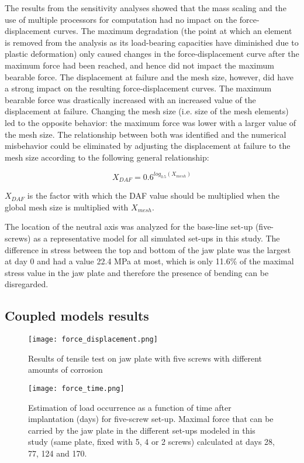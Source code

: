The results from the sensitivity analyses showed that the mass scaling and the use of multiple processors for computation had no impact on the force-displacement curves. The maximum degradation (the point at which an element is removed from the analysis as its load-bearing capacities have diminished due to plastic deformation) only caused changes in the force-displacement curve after the maximum force had been reached, and hence did not impact the maximum bearable force. The displacement at failure and the mesh size, however, did have a strong impact on the resulting force-displacement curves. The maximum bearable force was drastically increased with an increased value of the displacement at failure. Changing the mesh size (i.e. size of the mesh elements) led to the opposite behavior: the maximum force was lower with a larger value of the mesh size. The relationship between both was identified and the numerical misbehavior could be eliminated by adjusting the displacement at failure to the mesh size according to the following general relationship:

\begin{equation}
X_{DAF}=0.6^{log_{0.5}(X_{mesh})} 
\end{equation}

\noindent $X_{DAF}$ is the factor with which the \gls{DAF} value should be multiplied when the global mesh size is multiplied with $X_{mesh}$.

The location of the neutral axis was analyzed for the base-line set-up (five-screws) as a representative model for all simulated set-ups in this study. The difference in stress between the top and bottom of the jaw plate was the largest at day 0 and had a value 22.4 MPa at most, which is only 11.6\% of the maximal stress value in the jaw plate and therefore the presence of bending can be disregarded.


\subsection{Coupled models results}

\begin{figure}[h]
    \centering
    \texttt{[image: force\_displacement.png]}
    \caption{Results of tensile test on jaw plate with five screws with different amounts of corrosion}
    \label{fig:forcedisp}
\end{figure}

\begin{figure}[h]
    \centering
    \texttt{[image: force\_time.png]}
    \caption[Estimation of load occurrence as a function of time after implantation for five-screw set-up]{Estimation of load occurrence as a function of time after implantation (days) for five-screw set-up. Maximal force that can be carried by the jaw plate in the different set-ups modeled in this study (same plate, fixed with 5, 4 or 2 screws) calculated at days 28, 77, 124 and 170.}
    \label{fig:forcetime}
\end{figure}

